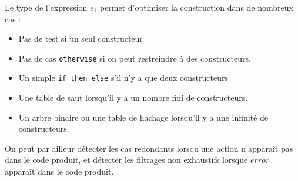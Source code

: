 \documentclass{cours}
\begin{document}
Le type de l'expression $e_{1}$ permet d'optimiser la construction dans de nombreux cas : 
\begin{itemize}
    \item Pas de test si un seul constructeur
    \item Pas de cas \texttt{otherwise} si on peut restreindre à des constructeurs. 
    \item Un simple \texttt{if then else} s'il n'y a que deux constructeurs
    \item Une table de saut lorsqu'il y a un nombre fini de constructeurs.
    \item Un arbre binaire ou une table de hachage lorsqu'il y a une infinité de constructeurs. 
\end{itemize}

On peut par ailleur détecter les cas redondants lorsqu'une action n'apparaît pas dans le code produit, et détecter les filtrages non exhaustifs lorsque $error$ apparaît dans le code produit. 
\end{document}
